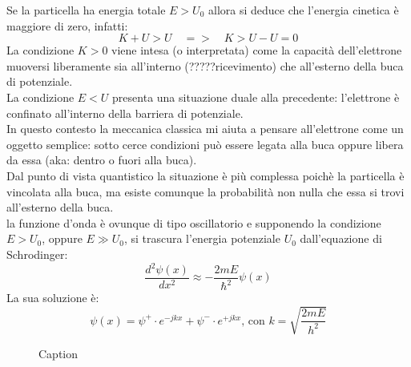 Se la particella ha energia totale $E > U_0$  allora si deduce che l'energia cinetica è maggiore di zero, infatti:
\begin{equation*}
    K+U > U \quad =>\quad K>U-U=0
\end{equation*}
La condizione $K>0$ viene intesa (o interpretata) come la capacità dell'elettrone muoversi liberamente sia all'interno (?????ricevimento) che all'esterno della buca di potenziale.\\
La condizione $E < U$ presenta una situazione duale alla precedente: l'elettrone è confinato all'interno della barriera di potenziale.\\
%
In questo contesto la meccanica classica mi aiuta a pensare all'elettrone come un oggetto semplice: sotto cerce condizioni può essere legata alla buca oppure libera da essa (aka: dentro o fuori alla buca).\\
%
Dal punto di vista quantistico la situazione è più complessa poichè la particella è vincolata alla buca, ma esiste comunque la probabilità non nulla che essa si trovi all'esterno della buca.\\
%
la funzione d'onda è ovunque di tipo oscillatorio e supponendo la condizione $E>U_0$, oppure $E \gg U_0$, si trascura l'energia potenziale $U_0$ dall'equazione di Schrodinger:
\begin{equation}
    \dfrac{d^2 \psi(x)}{dx^2} \approx -\dfrac{2mE}{\hslash^2}\psi(x)
\end{equation}
La sua soluzione è:
\begin{equation}
    \psi(x)= \psi^+ \cdot e^{-jkx} + \psi^-\cdot e^{+jkx} \text{, con } k=\sqrt{\dfrac{2mE}{h^2}}
\end{equation}
%
\begin{figure}[htb!]
    \centering
    \caption{Caption}%
    \label{fig:enter_label}
\end{figure}
